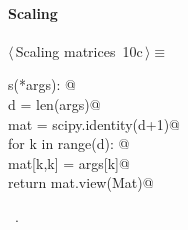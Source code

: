 \documentclass[11pt,oneside]{article}	%
\begin{document}
\paragraph{Scaling}
\begin{flushleft} \small \label{scrap20}
\protect{}$\langle\,$Scaling matrices\nobreak\ {\footnotesize 10c}$\,\rangle\equiv$
\vspace{-1ex}
\begin{list}{}{} \item
\mbox{}\verb@def s(*args): @\\
\mbox{}\verb@   d = len(args)@\\
\mbox{}\verb@   mat = scipy.identity(d+1)@\\
\mbox{}\verb@   for k in range(d): @\\
\mbox{}\verb@      mat[k,k] = args[k]@\\
\mbox{}\verb@   return mat.view(Mat)@\\
\mbox{}\verb@@{\NWsep}
\end{list}
\vspace{-1ex}
\footnotesize\addtolength{\baselineskip}{-1ex}
\begin{list}{}{\setlength{\itemsep}{-\parsep}\setlength{\itemindent}{-\leftmargin}}
\item \NWtxtMacroRefIn\ .
\end{list}
\end{flushleft}
\end{document}
